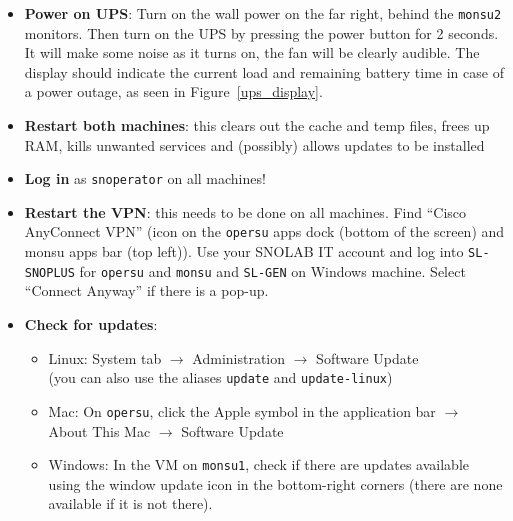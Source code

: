 \documentclass[12pt, a4paper]{article}
\begin{document}
\begin{itemize}
	\item \textbf{Power on UPS}: Turn on the wall power on the far right, behind the {\tt monsu2} monitors. Then turn on the UPS by pressing the power button for 2 seconds. It will make some noise as it turns on, the fan will be clearly audible. The display should indicate the current load and remaining battery time in case of a power outage, as seen in Figure~\ref{ups_display}.
	\item \textbf{Restart both machines}: this clears out the cache and temp files, frees up RAM, kills unwanted services and (possibly) allows updates to be installed
	\item \textbf{Log in} as {\tt snoperator} on all machines!
	\item \textbf{Restart the VPN}: this needs to be done on all machines. Find ``Cisco AnyConnect VPN'' (icon on the {\tt opersu} apps dock (bottom of the screen) and monsu apps bar (top left)). Use your SNOLAB IT account and log into {\tt SL-SNOPLUS} for {\tt opersu} and {\tt monsu} and {\tt SL-GEN} on Windows machine. Select ``Connect Anyway'' if there is a pop-up.
	\item \textbf{Check for updates}:
	\begin{itemize}
		\item Linux: System tab $\rightarrow$ Administration $\rightarrow$ Software Update \\
		      (you can also use the aliases {\tt update} and {\tt update-linux})
		\item Mac: On {\tt opersu}, click the Apple symbol in the application bar $\rightarrow$ About This Mac $\rightarrow$ Software Update 
		\item Windows: In the VM on {\tt monsu1}, check if there are updates available using the window update icon in the bottom-right corners (there are none available if it is not there).
	\end{itemize}
\end{itemize}

\end{document}

